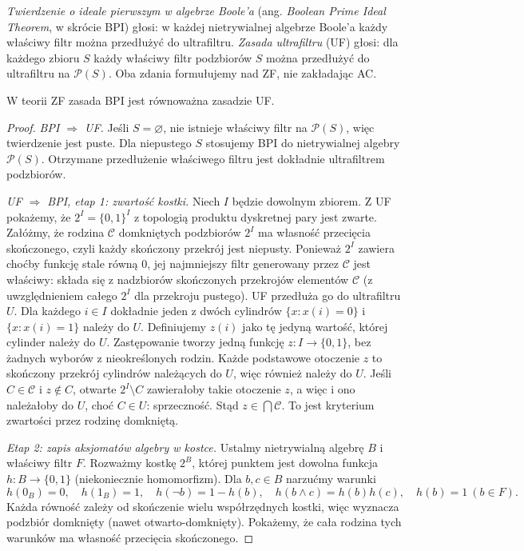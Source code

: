 \begin{definicja}\label{def:bpi-principles}
\emph{Twierdzenie o ideale pierwszym w algebrze Boole'a}
(ang. \emph{Boolean Prime Ideal Theorem}, w skrócie BPI)
głosi: w każdej nietrywialnej algebrze Boole'a każdy
właściwy filtr można przedłużyć do ultrafiltru.
\emph{Zasada ultrafiltru} (UF) głosi: dla każdego zbioru
$S$ każdy właściwy filtr podzbiorów $S$ można
przedłużyć do ultrafiltru na $\mathcal P(S)$.
Oba zdania formułujemy nad ZF, nie zakładając AC.
\end{definicja}

\begin{twierdzenie}
\label{thm:bpi-ultrafilter-equivalence}
W teorii ZF zasada BPI jest równoważna zasadzie UF.
\end{twierdzenie}
\begin{proof}
\emph{BPI $\Rightarrow$ UF.} Jeśli $S=\varnothing$,
nie istnieje właściwy filtr na $\mathcal P(S)$,
więc twierdzenie jest puste.
Dla niepustego $S$ stosujemy BPI
do nietrywialnej algebry $\mathcal P(S)$. Otrzymane przedłużenie
właściwego filtru jest dokładnie ultrafiltrem podzbiorów.

\emph{UF $\Rightarrow$ BPI, etap 1: zwartość kostki.}
Niech $I$ będzie dowolnym zbiorem. Z UF pokażemy, że
$2^I=\{0,1\}^I$ z topologią produktu dyskretnej pary
jest zwarte. Załóżmy, że rodzina $\mathcal C$ domkniętych
podzbiorów $2^I$ ma własność przecięcia skończonego,
czyli każdy skończony przekrój jest niepusty.
Ponieważ $2^I$ zawiera choćby funkcję stale równą $0$,
jej najmniejszy filtr generowany przez $\mathcal C$
jest właściwy: składa się z nadzbiorów
skończonych przekrojów elementów $\mathcal C$
(z uwzględnieniem całego $2^I$
dla przekroju pustego).
UF przedłuża go
do ultrafiltru $U$. Dla każdego $i\in I$ dokładnie jeden
z dwóch cylindrów $\{x:x(i)=0\}$ i $\{x:x(i)=1\}$
należy do $U$. Definiujemy $z(i)$ jako tę jedyną wartość,
której cylinder należy do $U$. Zastępowanie tworzy jedną
funkcję $z:I\to\{0,1\}$, bez żadnych wyborów
z nieokreślonych rodzin. Każde podstawowe otoczenie $z$
to skończony przekrój cylindrów należących do $U$,
więc również należy do $U$. Jeśli $C\in\mathcal C$ i
$z\notin C$, otwarte $2^I\setminus C$ zawierałoby takie
otoczenie $z$, a więc i ono należałoby do $U$, choć
$C\in U$: sprzeczność. Stąd $z\in\bigcap\mathcal C$.
To jest kryterium zwartości przez rodzinę domkniętą.

\emph{Etap 2: zapis aksjomatów algebry w kostce.}
Ustalmy nietrywialną algebrę $B$ i właściwy filtr $F$.
Rozważmy kostkę $2^B$, której punktem jest dowolna
funkcja $h:B\to\{0,1\}$ (niekoniecznie homomorfizm).
Dla $b,c\in B$ narzućmy warunki
\[
 h(0_B)=0,\quad h(1_B)=1,\quad
 h(\neg b)=1-h(b),\quad
 h(b\wedge c)=h(b)h(c),\quad h(b)=1\ (b\in F).
\]
Każda równość zależy od skończenie wielu współrzędnych
kostki, więc wyznacza podzbiór domknięty (nawet
otwarto-domknięty). Pokażemy, że cała rodzina tych
warunków ma własność przecięcia skończonego.


\end{proof}
